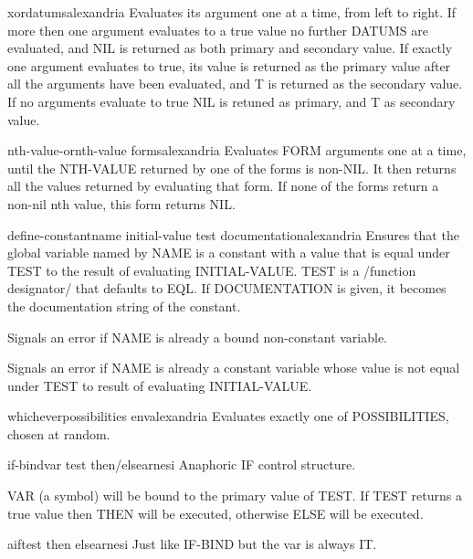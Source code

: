 \begin{macro}{xor}{\rest datums}{alexandria}{}
  Evaluates its argument one at a time, from left to right. If more then one
argument evaluates to a true value no further DATUMS are evaluated, and NIL is
returned as both primary and secondary value. If exactly one argument
evaluates to true, its value is returned as the primary value after all the
arguments have been evaluated, and T is returned as the secondary value. If no
arguments evaluate to true NIL is retuned as primary, and T as secondary
value.
\end{macro}

\begin{macro}{nth-value-or}{nth-value \body forms}{alexandria}{}
  Evaluates FORM arguments one at a time, until the NTH-VALUE returned by one
of the forms is non-NIL. It then returns all the values returned by evaluating
that form. If none of the forms return a non-nil nth value, this form returns
NIL.
\end{macro}

\begin{macro}{define-constant}{name initial-value \key test documentation}{alexandria}{}
  Ensures that the global variable named by NAME is a constant with a value
that is equal under TEST to the result of evaluating INITIAL-VALUE. TEST is a
/function designator/ that defaults to EQL. If DOCUMENTATION is given, it
becomes the documentation string of the constant.

Signals an error if NAME is already a bound non-constant variable.

Signals an error if NAME is already a constant variable whose value is not
equal under TEST to result of evaluating INITIAL-VALUE.
\end{macro}

\begin{macro}{whichever}{\rest possibilities \env env}{alexandria}{}
  Evaluates exactly one of POSSIBILITIES, chosen at random.
\end{macro}

\begin{macro}{if-bind}{var test \body then/else}{arnesi}{}
  Anaphoric IF control structure.

VAR (a symbol) will be bound to the primary value of TEST. If
TEST returns a true value then THEN will be executed, otherwise
ELSE will be executed.
\end{macro}

\begin{macro}{aif}{test then \op else}{arnesi}{}
  Just like IF-BIND but the var is always IT.
\end{macro}

